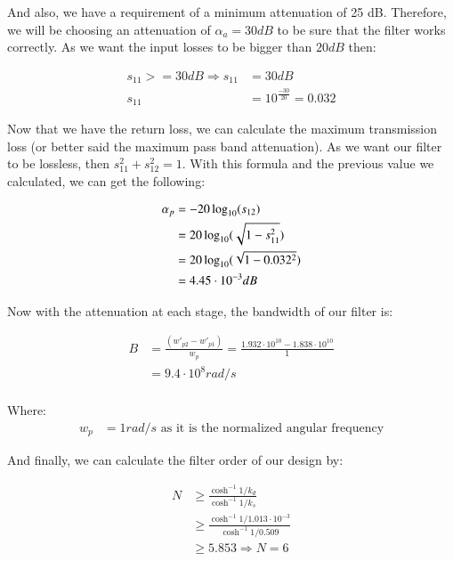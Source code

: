 \documentclass[12pt]{report} %
\begin{document}
And also, we have a requirement of a minimum attenuation of 25 dB. Therefore, we will be choosing an attenuation of $\alpha_{a} = 30 dB$ to be sure that the filter works correctly. As we want the input losses to be bigger than $20 dB$ then:

\begin{align*}
s_{11} >= 30 dB \Rightarrow s_{11} &= 30 dB \\
s_{11} &= 10^{\frac{-30}{20}} = 0.032
\end{align*}

Now that we have the return loss, we can calculate the maximum transmission loss (or better said the maximum pass band attenuation). As we want our filter to be lossless, then $s_{11}^2 + s_{12}^2 = 1$. With this formula and the previous value we calculated, we can get the following:

\begin{align*}
\alpha_{p} &= - 20 \* \log_{10}(s_{12}) \\
&= \-20 \* \log_{10}(\sqrt{1 - s_{11}^2}) \\
&= \-20 \* \log_{10}(\sqrt{1 - 0.032^2}) \\
&= 4.45 \cdot 10^{-3} dB
\end{align*}

Now with the attenuation at each stage, the bandwidth of our filter is:

\begin{align*}
B &= \frac{(w'_{p2} - w'_{p1})}{w_p} = \frac{1.932 \cdot 10^{10} - 1.838 \cdot 10^{10}}{1} \\
&= 9.4 \cdot 10^{8} rad/s \\
\end{align*}

Where:
\begin{align*}
w_p &= 1 rad/s \text{ as it is the normalized angular frequency}
\end{align*}

And finally, we can calculate the filter order of our design by:

\begin{align*}
N &\geq \frac{\cosh^{-1}{1/k_d}}{\cosh^{-1}{1/k_s}} \\
&\geq \frac{\cosh^{-1}{1/1.013 \cdot 10^{-3}}}{\cosh^{-1}{1/0.509}} \\
&\geq 5.853 \Rightarrow N = 6
\end{align*}
\end{document}
